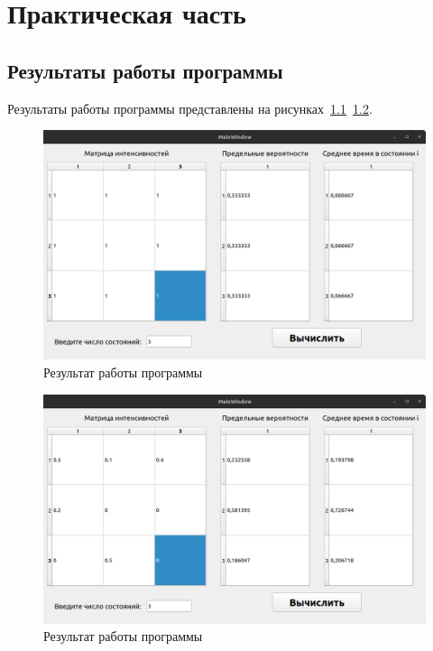 \chapter{Практическая часть}
\section{Результаты работы программы}
Результаты работы программы представлены на рисунках~\ref{fig:res1}~\ref{fig:res2}.
\begin{figure}[H]
    \centering
    \includegraphics[width=0.9\linewidth]{images/example_1.png}
    \caption{Результат работы программы}
    \label{fig:res1}
\end{figure}
\begin{figure}[H]
    \centering
    \includegraphics[width=0.9\linewidth]{images/example_2.png}
    \caption{Результат работы программы}
    \label{fig:res2}
\end{figure}